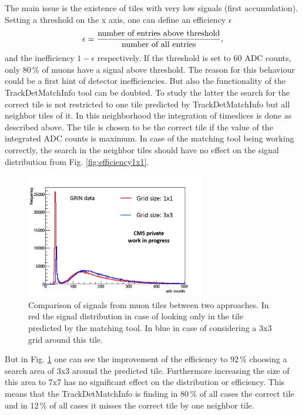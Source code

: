 			The main issue is the existence of tiles with very low signals (first accumulation).
			Setting a threshold on the x axis, one can define an efficiency $\epsilon$
			\begin{equation}
				\epsilon = \frac{\textnormal{number of entries above threshold}}{\textnormal{number of all entries}},
			\end{equation}
			and the inefficiency $1-\epsilon$ respectively.
			If the threshold is set to 60 ADC counts, only 80\,\% of muons have a signal above threshold.
			The reason for this behaviour could be a first hint of detector inefficiencies.
			But also the functionality of the TrackDetMatchInfo tool can be doubted.
			To study the latter the search for the correct tile is not restricted to one tile predicted by TrackDetMatchInfo but all neighbor tiles of it.
			In this neighborhood the integration of timeslices is done as described above.
			The tile is chosen to be the correct tile if the value of the integrated ADC counts is maximum.
			In case of the matching tool being working correctly, the search in the neighbor tiles should have no effect on the signal distribution from Fig. \ref{fig:efficiency1x1}.
			\begin{figure}[htbp]
				\centering
				\includegraphics[width=0.70\textwidth]{Figures/erdogan/neighborhood.png}
				\caption{Comparison of signals from muon tiles between two approaches. In red the signal distribution in case of looking only in the tile predicted by the matching tool. In blue in case of
				considering a 3x3 grid around this tile.}
				\label{fig:neighborhood}
			\end{figure}
			But in Fig. \ref{fig:neighborhood} one can see the improvement of the efficiency to 92\,\% choosing a search area of 3x3 around the predicted tile.
			Furthermore increasing the size of this area to 7x7 has no significant effect on the distribution or efficiency.
			This means that the TrackDetMatchInfo is finding in 80\,\% of all cases the correct tile and in 12\,\% of all cases it misses the correct tile by one neighbor tile.
